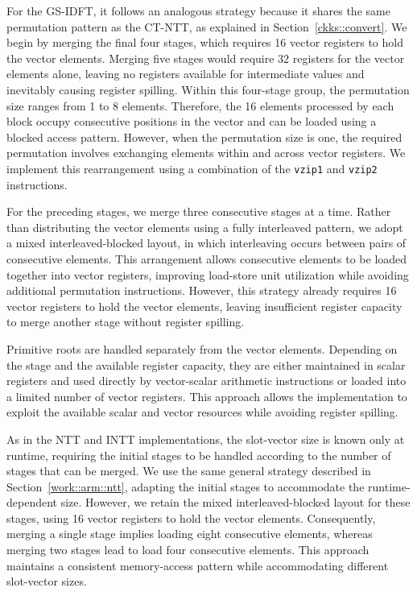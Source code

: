 For the GS-IDFT, it follows an analogous strategy because it shares the same permutation pattern as the CT-NTT, as explained in Section~\ref{ckks::convert}. We begin by merging the final four stages, which requires 16 vector registers to hold the vector elements. Merging five stages would require 32 registers for the vector elements alone, leaving no registers available for intermediate values and inevitably causing register spilling. Within this four-stage group, the permutation size ranges from 1 to 8 elements. Therefore, the 16 elements processed by each block occupy consecutive positions in the vector and can be loaded using a blocked access pattern. However, when the permutation size is one, the required permutation involves exchanging elements within and across vector registers. We implement this rearrangement using a combination of the \texttt{vzip1} and \texttt{vzip2} instructions.

For the preceding stages, we merge three consecutive stages at a time. Rather than distributing the vector elements using a fully interleaved pattern, we adopt a mixed interleaved-blocked layout, in which interleaving occurs between pairs of consecutive elements. This arrangement allows consecutive elements to be loaded together into vector registers, improving load-store unit utilization while avoiding additional permutation instructions. However, this strategy already requires 16 vector registers to hold the vector elements, leaving insufficient register capacity to merge another stage without register spilling.

Primitive roots are handled separately from the vector elements. Depending on the stage and the available register capacity, they are either maintained in scalar registers and used directly by vector-scalar arithmetic instructions or loaded into a limited number of vector registers. This approach allows the implementation to exploit the available scalar and vector resources while avoiding register spilling.

As in the NTT and INTT implementations, the slot-vector size is known only at runtime, requiring the initial stages to be handled according to the number of stages that can be merged. We use the same general strategy described in Section~\ref{work::arm::ntt}, adapting the initial stages to accommodate the runtime-dependent size. However, we retain the mixed interleaved-blocked layout for these stages, using 16 vector registers to hold the vector elements. Consequently, merging a single stage implies loading eight consecutive elements, whereas merging two stages lead to load four consecutive elements. This approach maintains a consistent memory-access pattern while accommodating different slot-vector sizes.

